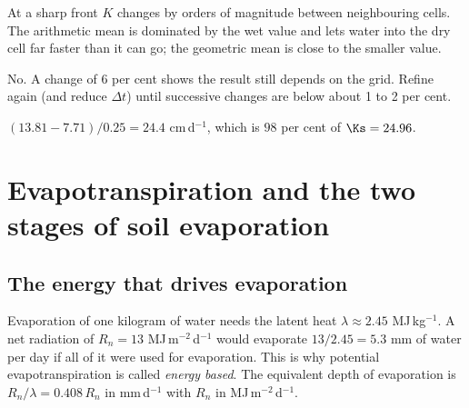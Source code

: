 \sol  At a sharp front $K$ changes by orders of magnitude between neighbouring cells. The arithmetic mean is dominated by the wet value and lets water into the dry cell far faster than it can go; the geometric mean is close to the smaller value.

\sol  No. A change of 6 per cent shows the result still depends on the grid. Refine again (and reduce $\Delta t$) until successive changes are below about 1 to 2 per cent.

\sol  $(13.81-7.71)/0.25=24.4$ cm\,d$^{-1}$, which is $98$ per cent of $\Ks=24.96$.


\chapter{Evapotranspiration and the two stages of soil evaporation}

\section{The energy that drives evaporation}
Evaporation of one kilogram of water needs the latent heat $\lambda\approx2.45$ MJ\,kg$^{-1}$. A net radiation of $R_n=13$ MJ\,m$^{-2}$\,d$^{-1}$ would evaporate $13/2.45=5.3$ mm of water per day if all of it were used for evaporation. This is why potential evapotranspiration is called \emph{energy based}. The equivalent depth of evaporation is $R_n/\lambda=0.408\,R_n$ in mm\,d$^{-1}$ with $R_n$ in MJ\,m$^{-2}$\,d$^{-1}$.

